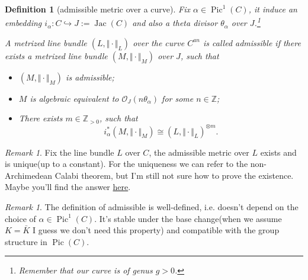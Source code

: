 \documentclass[reqno,11pt]{amsart}
\numberwithin{equation}{section}
\theoremstyle{plain}
\newtheorem{defn}[theorem]{Definition}
\theoremstyle{plain}
\numberwithin{equation}{section}
\theoremstyle{remark}
\newtheorem{remark}[theorem]{Remark}
\DeclareMathOperator{\Pic}{\operatorname{Pic}}
\DeclareMathOperator{\Jac}{\operatorname{Jac}}
\newcommand{\norm}[1]{\Vert{#1}\Vert}
\begin{document}
\begin{defn}[admissible metric over a curve]
Fix $\alpha \in \Pic^1(C)$, it induce an embedding $i_{\alpha}:C \hookrightarrow J:=\Jac(C)$ and also a theta divisor $\theta_{\alpha}$ over $J$.\footnote{Remember that our curve is of genus $g>0$.} 

A metrized line bundle $(L,\norm{\cdot}_L)$ over the curve $C^{an}$ is called admissible if there exists a metrized line bundle $(M,\norm{\cdot}_M)$ over $J$, such that 
\begin{itemize}
\item $(M,\norm{\cdot}_M)$ is admissible;
\item $M$ is algebraic equivalent to $\mathcal{O}_J(n\theta_{\alpha})$ for some $n \in \mathbb{Z}$;
\item There exists $m \in \mathbb{Z}_{>0}$, such that $$i_{\alpha}^*(M,\norm{\cdot}_M) \cong (L,\norm{\cdot}_L)^{\otimes m}.$$
\end{itemize}
\end{defn}
\begin{center}
\end{center}
\begin{remark}
Fix the line bundle $L$ over $C$, the admissible metric over $L$ exists and is unique(up to a constant). For the uniqueness we can refer to the non-Archimedean Calabi theorem, but I'm still not sure how to prove the existence. Maybe you'll find the answer \href{http://qirui.li/main.pdf}{here}.
\end{remark}
\begin{remark}
The definition of admissible is well-defined, i.e. doesn't depend on the choice of $\alpha \in \Pic^1(C)$. It's stable under the base change(when we assume $K=\bar{K}$ I guess we don't need this property) and compatible with the group structure in $\Pic(C)$.
\end{remark}
\end{document}
